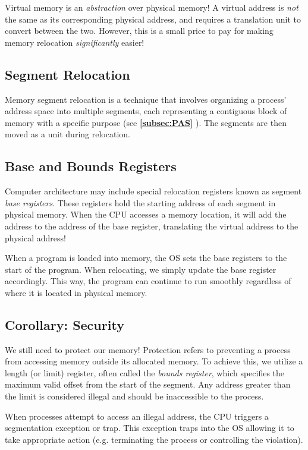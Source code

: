 \documentclass{report}
\newcommand{\abstractionBegin}[1]{\begin{tcolorbox}[colback=violet!5!white,colframe=violet,title={Abstraction:
      #1}]}
\newcommand{\abstractionEnd}{\end{tcolorbox}}
\newcommand{\refto}[2]{\textbf{\ref{#1:#2} \nameref{#1:#2}}}
\begin{document}
\abstractionBegin{Virtual Memory}
Virtual memory is an \textit{abstraction} over physical memory! A virtual address is \textit{not}
the same as its corresponding physical address, and requires a translation unit to convert between
the two. However, this is a small price to pay for making memory relocation \textit{significantly}
easier!
\abstractionEnd


\subsection{Segment Relocation}
Memory segment relocation is a technique that involves organizing a process' address space into
multiple segments, each representing a contiguous block of memory with a specific purpose (see
\refto{subsec}{PAS}). The segments are then moved as a unit during relocation.


\subsection{Base and Bounds Registers}
Computer architecture may include special relocation registers known as segment \textit{base
  registers}. These registers hold the starting address of each segment in physical memory. When the
CPU accesses a memory location, it will add the address to the address of the base register,
translating the virtual address to the physical address!

When a program is loaded into memory, the OS sets the base registers to the start of the
program. When relocating, we simply update the base register accordingly. This way, the program can
continue to run smoothly regardless of where it is located in physical memory.


\subsection*{Corollary: Security}
We still need to protect our memory! Protection refers to preventing a process from accessing memory
outside its allocated memory. To achieve this, we utilize a length (or limit) register, often
called the \textit{bounds register}, which specifies the maximum valid offset from the start of the
segment. Any address greater than the limit is considered illegal and should be inaccessible to the
process. 

When processes attempt to access an illegal address, the CPU triggers a segmentation exception or
trap. This exception traps into the OS allowing it to take appropriate action (e.g. terminating the
process or controlling the violation).
\end{document}
